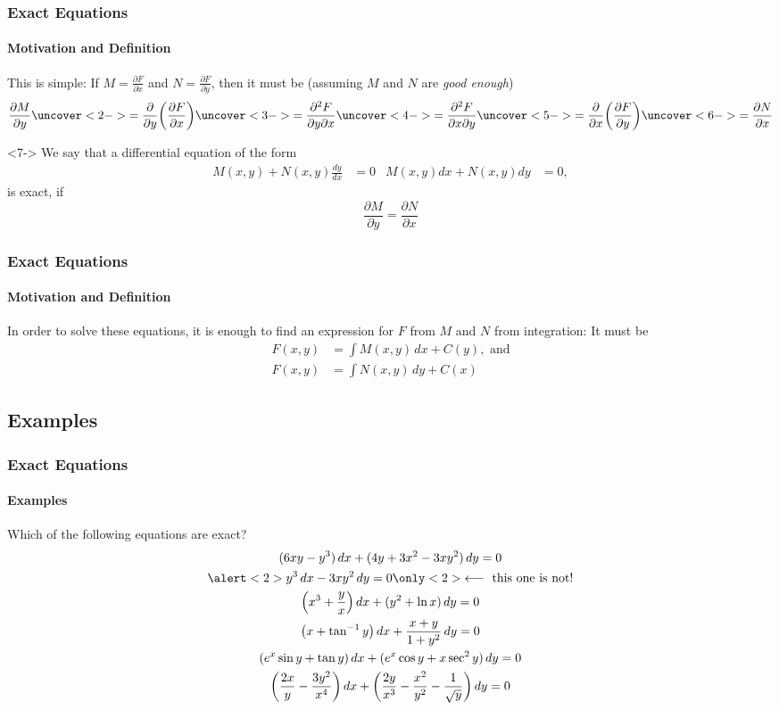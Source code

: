 \documentclass[10pt,xcolor=x11names,compress]{beamer}
\begin{document}
\begin{frame}\frametitle{Exact Equations}
\framesubtitle{Motivation and Definition}
This is simple: If $M=\frac{\partial F}{\partial x}$ and $N=\frac{\partial F}{\partial y}$, then it must be (assuming $M$ and $N$ are \emph{good enough})
\begin{equation*}
	\frac{\partial M}{\partial y} \uncover<2->{= \frac{\partial}{\partial y} \bigg( \frac{\partial F}{\partial x} \bigg)} \uncover<3->{= \frac{\partial^2 F}{\partial y\partial x}} \uncover<4->{= \frac{\partial^2 F}{\partial x\partial y}}\uncover<5->{= \frac{\partial}{\partial x} \bigg( \frac{\partial F}{\partial y} \bigg)}\uncover<6->{= \frac{\partial N}{\partial x}}
\end{equation*}
\begin{definition}<7->
	We say that a differential equation of the form
\begin{align*}
	M(x,y)+N(x,y)\frac{dy}{dx}&=0 & M(x,y)dx + N(x,y)dy &=0,
\end{align*}
is exact, if
\begin{equation*}
	\frac{\partial M}{\partial y} = \frac{\partial N}{\partial x}
\end{equation*}
\end{definition}
\end{frame}

\begin{frame}\frametitle{Exact Equations}
\framesubtitle{Motivation and Definition}
In order to solve these equations, it is enough to find an expression for $F$ from $M$ and $N$ from integration: It must be
\begin{align*}
  	F(x,y) &= \int M(x,y)\,dx + C(y), \text{ and} \\
  	F(x,y) &= \int N(x,y)\, dy + C(x)
  \end{align*}  
\end{frame}

\subsection{Examples}
\begin{frame}\frametitle{Exact Equations}
\framesubtitle{Examples}
\begin{block}{Which of the following equations are exact?}
	\begin{gather*}
		(6xy-y^3)\, dx +(4y+3x^2-3xy^2)\, dy=0 \\
		\alert<2>{y^3\, dx-3xy^2\, dy =0 \only<2>{\longleftarrow \text{ this one is not!}}}\\ 
		\Big(x^3 + \frac{y}{x} \Big)\, dx + (y^2 + \ln x)\, dy = 0 \\  
		\big( x + \tan^{-1} y\big)\, dx + \frac{x+y}{1+y^2}\, dy =0 \\
		(e^x \sin y + \tan y)\, dx + (e^x\cos y + x \sec^2 y)\, dy = 0 \\ 
		\bigg( \frac{2x}{y}- \frac{3y^2}{x^4} \bigg)\, dx + \bigg( \frac{2y}{x^3} - \frac{x^2}{y^2} - \frac{1}{\sqrt{y}} \bigg)\, dy =0
	\end{gather*}
\end{block}
\end{frame}
\end{document}
